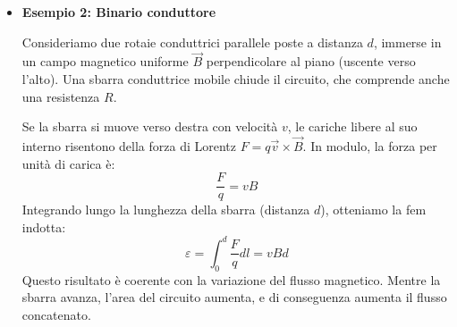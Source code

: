 \documentclass{book}
\begin{document}
\begin{itemize}
\paragraph{Caso 2: Magnete fermo e spira in rotazione}
Consideriamo ora il sistema solidale con il magnete (campo $\vec{B}$ statico) e mettiamo in rotazione la spira. In questo riferimento non esiste un campo elettrico indotto (poiché $\partial \vec{B}/\partial t = 0$). La forza che agisce sulle cariche è la \textbf{forza di Lorentz} dovuta al moto del conduttore nel campo magnetico.
I portatori di carica nei lati della spira si muovono con una velocità tangenziale $v$, subendo una forza $F = q \vec{v} \times \vec{B}$.
Considerando la geometria del sistema, sui lati paralleli all'asse di rotazione (che si muovono a distanza $b/2$ dall'asse con velocità $v=\omega b/2$), la forza per unità di carica proiettata lungo il filo vale:
$$F = q \left(\omega \frac{b}{2}\right) B \cos(\omega t)$$
Sugli altri due lati (di lunghezza $a$), la forza di Lorentz è perpendicolare al filo e non contribuisce alla circuitazione.
Calcolando la circuitazione totale (sommando i contributi dei due lati attivi di lunghezza complessiva $2a$):
$$\oint_\gamma \frac{F}{q}\, dl = - \left( \omega \frac{b}{2} B \cos(\omega t) \right) \cdot 2a = - B a b \omega \cos(\omega t)$$
Il risultato coincide perfettamente con quello calcolato tramite la legge del flusso. Anche in questo caso, la fem oscilla cosinusoidalmente.

\textbf{Nota fisica:} Sebbene il risultato matematico sia identico, l'interpretazione fisica cambia a seconda del sistema di riferimento. Nel caso della spira in moto, la fem nasce dalla componente tangenziale della forza di Lorentz che separa le cariche lungo il conduttore. Il verso della corrente risultante è comunque conforme alla legge di Lenz.

\item \hypertarget{Es2}{\textbf{Esempio 2: Binario conduttore }}
Consideriamo due rotaie conduttrici parallele poste a distanza $d$, immerse in un campo magnetico uniforme $\vec{B}$ perpendicolare al piano (uscente verso l'alto). Una sbarra conduttrice mobile chiude il circuito, che comprende anche una resistenza $R$.

Se la sbarra si muove verso destra con velocità $v$, le cariche libere al suo interno risentono della forza di Lorentz $F = q\vec{v}\times\vec{B}$. In modulo, la forza per unità di carica è:
$$\frac{F}{q}= vB$$
Integrando lungo la lunghezza della sbarra (distanza $d$), otteniamo la fem indotta:
$$\varepsilon = \int_0^d \frac{F}{q}dl = vBd$$
Questo risultato è coerente con la variazione del flusso magnetico. Mentre la sbarra avanza, l'area del circuito aumenta, e di conseguenza aumenta il flusso concatenato.


\end{itemize}
\end{document}
